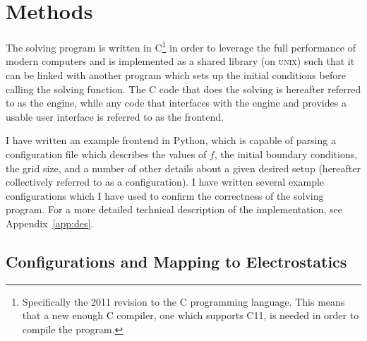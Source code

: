 \section{Methods}

The solving program is written in C\footnote{Specifically the 2011 revision to the C programming language. This means that a new enough
C compiler, one which supports C11, is needed in order to compile the program.} in order to leverage the full performance of modern computers and is implemented
as a shared library (on \textsc{unix}) such that it can be linked with another program which sets up the initial conditions
before calling the solving function. The C code that does the solving is hereafter referred to as the engine, while any code
that interfaces with the engine and provides a usable user interface is referred to as the frontend.

I have written an example frontend in Python, which is capable of parsing a configuration file which describes the
values of $f$, the initial boundary conditions, the grid size, and a number of other details about a given desired
setup (hereafter collectively referred to as a configuration). I have written several example configurations which I have used to
confirm the correctness of the solving program. For a more detailed technical description of the implementation, see Appendix~\ref{app:des}.









\subsection{Configurations and Mapping to Electrostatics}

